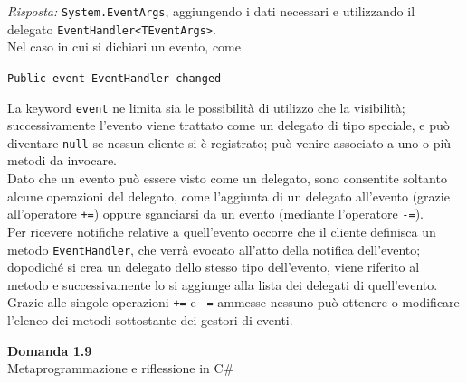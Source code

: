 \documentclass{article}
\newenvironment{problem}[2][Domanda]
    { \begin{mdframed}[backgroundcolor=gray!20] \textbf{#1 #2} \\}
    {  \end{mdframed}}
\newenvironment{solution}
    {\textit{Risposta:}}
    {}
\begin{document}
\begin{solution}
\texttt{System.EventArgs}, aggiungendo i dati necessari e utilizzando il delegato \texttt{EventHandler<TEventArgs>}.
\\
Nel caso in cui si dichiari un evento, come
\begin{center}
	\texttt{Public event EventHandler changed}
\end{center}
La keyword \texttt{event} ne limita sia le possibilità di utilizzo che la visibilità; successivamente l’evento viene trattato come
un delegato di tipo speciale, e può diventare \texttt{null} se nessun cliente si è registrato; può venire associato a uno o più
metodi da invocare.
\\
Dato che un evento può essere visto come un delegato, sono consentite soltanto alcune operazioni del delegato,
come l’aggiunta di un delegato all’evento (grazie all’operatore \texttt{+=}) oppure sganciarsi da un evento (mediante
l’operatore \texttt{-=}).
\\
Per ricevere notifiche relative a quell’evento occorre che il cliente definisca un metodo \texttt{EventHandler}, che verrà
evocato all’atto della notifica dell’evento; dopodiché si crea un delegato dello stesso tipo dell’evento, viene riferito al
metodo e successivamente lo si aggiunge alla lista dei delegati di quell’evento.
\\Grazie alle singole operazioni \texttt{+=} e \texttt{-=} ammesse nessuno può ottenere o modificare l’elenco dei metodi sottostante dei
gestori di eventi.

\end{solution}
\begin{problem}{1.9}
Metaprogrammazione e riflessione in C\#
\end{problem}
\end{document}
